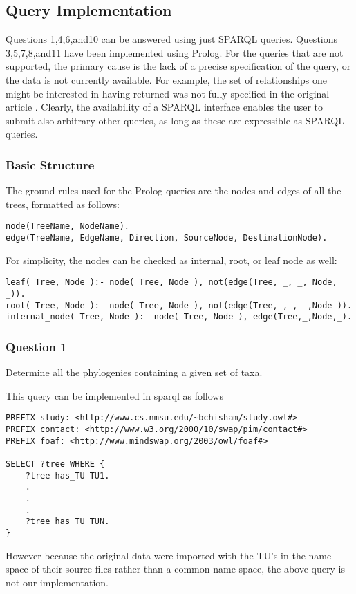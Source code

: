\documentclass[10pt]{article}
\begin{document}
\subsection{Query Implementation}
Questions 1,4,6,and10 can be answered using just SPARQL queries.  Questions
3,5,7,8,and11 have been implemented using Prolog.   For the queries that are
not supported, the primary cause is the lack of a precise specification of the
query, or the data is not currently available. For example, the set of
relationships one might be interested in having returned was not fully
specified in the original article \cite{queries}.  Clearly, the availability of a SPARQL
interface enables the user to submit also arbitrary other queries, as long as
these are expressible as SPARQL queries.
\subsubsection{Basic Structure}

The ground rules used for the Prolog queries are the nodes and edges of all the
trees, formatted as follows:
\begin{verbatim}
node(TreeName, NodeName).
edge(TreeName, EdgeName, Direction, SourceNode, DestinationNode).
\end{verbatim}

For simplicity, the nodes can be checked as internal, root, or leaf node as well:
\begin{verbatim}
leaf( Tree, Node ):- node( Tree, Node ), not(edge(Tree, _, _, Node, _)).
root( Tree, Node ):- node( Tree, Node ), not(edge(Tree,_,_, _,Node )).
internal_node( Tree, Node ):- node( Tree, Node ), edge(Tree,_,Node,_).
\end{verbatim}

\subsubsection{Question 1}
 Determine all the phylogenies containing a given set of taxa.

This query can be implemented in sparql as follows
\begin{verbatim}
PREFIX study: <http://www.cs.nmsu.edu/~bchisham/study.owl#>
PREFIX contact: <http://www.w3.org/2000/10/swap/pim/contact#>
PREFIX foaf: <http://www.mindswap.org/2003/owl/foaf#>

SELECT ?tree WHERE {
    ?tree has_TU TU1.
    .
    .
    .
    ?tree has_TU TUN.
}
\end{verbatim}
However because the original data were imported with the TU's in the name space
of their source files rather than a common name space, the above query is not
our implementation.
\end{document}

